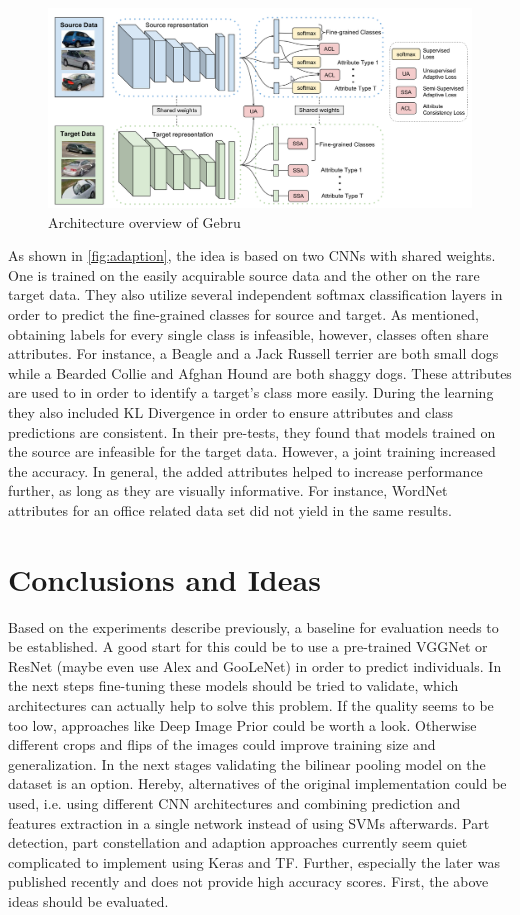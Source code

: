\documentclass[electronic]{vgtc}             %
\begin{document}
	\begin{figure}[h]
		\includegraphics[width=.48\textwidth]{adaption}
		\caption{Architecture overview of Gebru\cite{Gebru:2017}}
		\label{fig:adaption}
	\end{figure}

	As shown in \autoref{fig:adaption}, the idea is based on two CNNs with shared weights.
	One is trained on the easily acquirable source data and the other on the rare target data. 
	They also utilize several independent softmax classification layers in order to predict the fine-grained classes for source and target.
	As mentioned, obtaining labels for every single class is infeasible, however, classes often share attributes. 
	For instance, a Beagle and a Jack Russell terrier are both small dogs while a Bearded Collie and Afghan Hound are both shaggy dogs.
	These attributes are used to in order to identify a target's class more easily.
	During the learning they also included KL Divergence in order to ensure attributes and class predictions are consistent. 
	In their pre-tests, they found that models trained on the source are infeasible for the target data.
	However, a joint training increased the accuracy. 
	In general, the added attributes helped to increase performance further, as long as they are visually informative. 
	For instance, WordNet attributes for an office related data set did not yield in the same results.
	
	\section{Conclusions and Ideas}
	
	Based on the experiments describe previously, a baseline for evaluation needs to be established. 
	A good start for this could be to use a pre-trained VGGNet or ResNet (maybe even use Alex and GooLeNet) in order to predict individuals. 
	In the next steps fine-tuning these models should be tried to validate, which architectures can actually help to solve this problem. 
	If the quality seems to be too low, approaches like Deep Image Prior \cite{Ulyanov:2017} could be worth a look.
	Otherwise different crops and flips of the images could improve  training size and generalization.
	In the next stages validating the bilinear pooling model on the dataset is an option.
	Hereby, alternatives of the original implementation could be used, i.e. using different CNN architectures and combining prediction and features extraction in a single network instead of using SVMs afterwards.
	Part detection, part constellation and adaption approaches currently seem quiet complicated to implement using Keras and TF.
	Further, especially the later was published recently and does not provide high accuracy scores.
	First, the above ideas should be evaluated.
	
\end{document}
